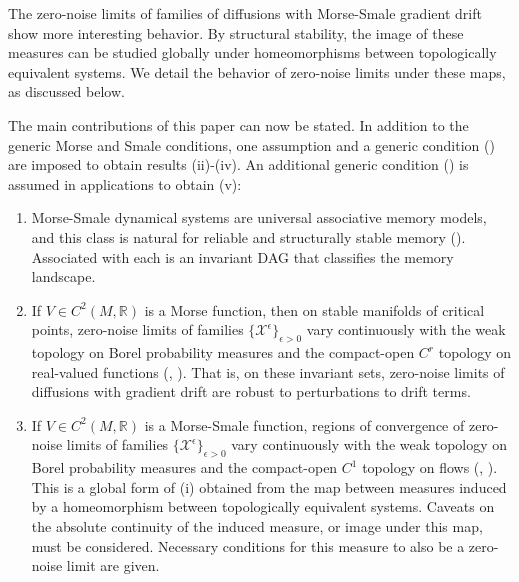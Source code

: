 \documentclass[12pt]{article}
\begin{document}
The zero-noise limits of families of diffusions with Morse-Smale gradient drift show more interesting behavior. By structural stability, the image of these measures can be studied globally under homeomorphisms between topologically equivalent systems. We detail the behavior of zero-noise limits under these maps, as discussed below. 

\vspace{1em}
\noindent
The main contributions of this paper can now be stated. In addition to the generic Morse and Smale conditions, one assumption and a generic condition () are imposed to obtain results (ii)-(iv). An additional generic condition () is assumed in applications to obtain (v):
\begin{enumerate}[label=(\roman*), itemsep=0pt]

    \item Morse-Smale dynamical systems are universal associative memory models, and this class is natural for reliable and structurally stable memory (). Associated with each is an invariant DAG that classifies the memory landscape.
    
    \item If $V \in C^2(M,\mathbb{R})$ is a Morse function, then on stable manifolds of critical points, zero-noise limits of families $\{ \mathcal{X}^{\epsilon}\}_{\epsilon >0}$ vary continuously with the weak topology on Borel probability measures and the compact-open $C^r$ topology on real-valued functions (, ). That is, on these invariant sets, zero-noise limits of diffusions with gradient drift are robust to perturbations to drift terms.
    
    \item If $V \in C^2(M,\mathbb{R})$ is a Morse-Smale function, regions of convergence of zero-noise limits of families $\{ \mathcal{X}^{\epsilon}\}_{\epsilon >0}$ vary continuously with the weak topology on Borel probability measures and the compact-open $C^1$ topology on flows (, ). This is a global form of (i) obtained from the map between measures induced by a homeomorphism between topologically equivalent systems. Caveats on the absolute continuity of the induced measure, or image under this map, must be considered. Necessary conditions for this measure to also be a zero-noise limit are given.


\end{enumerate}
\end{document}
